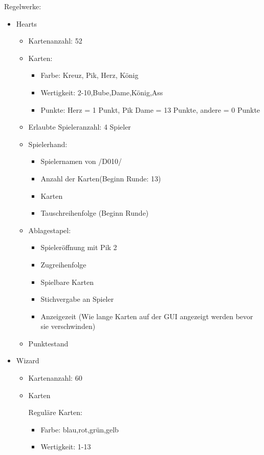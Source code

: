 \documentclass{article}
\begin{document}
\begin{itemize}
	Regelwerke:
	\begin{itemize}
		\item Hearts
		\begin{itemize}
			\item Kartenanzahl: 52
			\item Karten:
			\begin{itemize}
				\item Farbe: Kreuz, Pik, Herz, König
				\item Wertigkeit: 2-10,Bube,Dame,König,Ass
				\item Punkte: Herz = 1 Punkt, Pik Dame = 13 Punkte, andere = 0 Punkte
			\end{itemize}
			\item Erlaubte Spieleranzahl: 4 Spieler
			\item Spielerhand:
			\begin{itemize}
				\item Spielernamen von /D010/
				\item Anzahl der Karten(Beginn Runde: 13)
				\item Karten
				\item Tauschreihenfolge (Beginn Runde)
			\end{itemize}
			\item Ablagestapel:
			\begin{itemize}
				\item Spieleröffnung mit Pik 2
				\item Zugreihenfolge
				\item Spielbare Karten
				\item Stichvergabe an Spieler
				\item Anzeigezeit (Wie lange Karten auf der GUI angezeigt werden bevor sie verschwinden)
			\end{itemize}
				\item Punktestand
		\end{itemize}
		
		\item Wizard
		\begin{itemize}
			\item Kartenanzahl: 60
			\item Karten

			Reguläre Karten:
			\begin{itemize}
				\item Farbe: blau,rot,grün,gelb
				\item Wertigkeit: 1-13
			\end{itemize}


\end{itemize}
\end{itemize}
\end{itemize}
\end{document}
